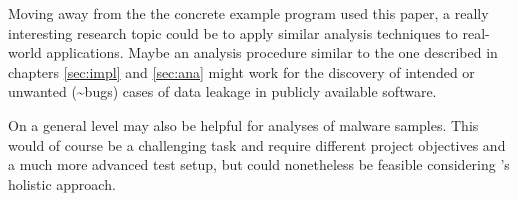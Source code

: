 \medskip
Moving away from the the concrete example program used this paper, a really interesting research topic could be to apply similar analysis techniques to real-world applications.
Maybe an analysis procedure similar to the one described in chapters \ref{sec:impl} and \ref{sec:ana} might work for the discovery of intended or unwanted (\textasciitilde bugs) cases of data leakage in publicly available software.

On a general level \sse may also be helpful for analyses of malware samples.
This would of course be a challenging task and require different project objectives and a much more advanced test setup, but could nonetheless be feasible considering \sse's holistic approach.




\iffalse
§7	Outlook
		> Was man sonst noch Tolles machen könnte.
		> Anwendung auf echte Malware, etc…
\fi


